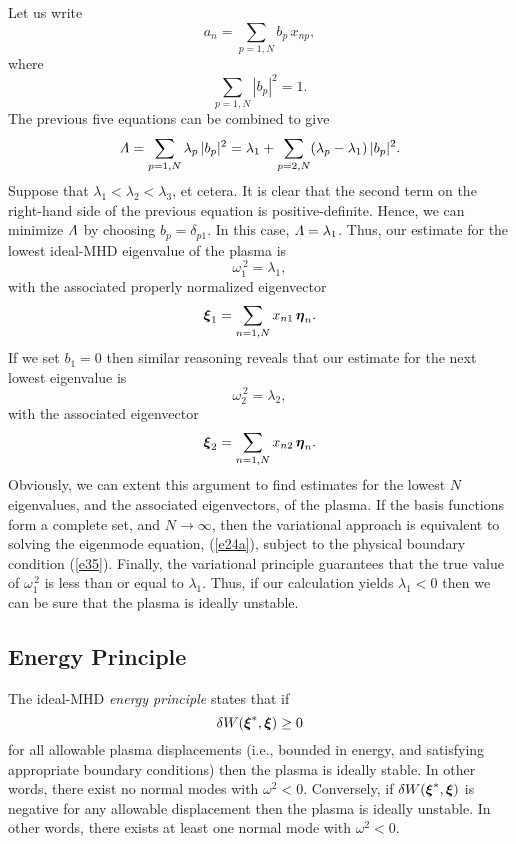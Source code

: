 \documentclass[12pt,prb,aps,notitlepage]{revtex4-1}
\newcommand{\bxi}{\mbox{\boldmath$\xi$}}
\newcommand{\bta}{\mbox{\boldmath$\eta$}}
\begin{document}
Let us write
\begin{equation}
a_n =\sum_{p=1,N}b_p\,x_{np},
\end{equation}
where
\begin{equation}
\sum_{p=1,N}|b_p|^2 = 1.
\end{equation}
The previous five equations can be combined to give
\begin{equation}
{\mit\Lambda} = \sum_{p=1,N}\lambda_p\,|b_p|^2= \lambda_1 +\sum_{p=2,N}(\lambda_p-\lambda_1)\,|b_p|^2.
\end{equation}
Suppose that $\lambda_1<\lambda_2<\lambda_3$, et cetera. It is clear that the second term on the right-hand side of the
previous equation is positive-definite. Hence, we can minimize ${\mit\Lambda}$ by choosing $b_p = \delta_{p1}$. In this case,
${\mit\Lambda}=\lambda_1$. Thus, our estimate for the lowest ideal-MHD eigenvalue of the plasma is
\begin{equation}
\omega_1^{\,2}= \lambda_1,
\end{equation}
with the associated properly normalized eigenvector
\begin{equation}
\bxi_1 = \sum_{n=1,N} x_{n1}\,\bta_{n}.
\end{equation}
If we set $b_1=0$ then similar reasoning reveals that our estimate for the next lowest eigenvalue is
\begin{equation}
\omega_2^{\,2}=\lambda_2,
\end{equation}
with the associated eigenvector
\begin{equation}
\bxi_2 = \sum_{n=1,N} x_{n2}\,\bta_{n}.
\end{equation}
Obviously, we can extent this argument to find estimates for the lowest $N$ eigenvalues, and the associated eigenvectors, of the plasma. If
the basis functions form a complete set, and $N\rightarrow\infty$,  then the variational approach is equivalent to solving the eigenmode equation, (\ref{e24a}), subject to
the physical boundary condition (\ref{e35}). 
Finally, the variational principle guarantees that the true value of $\omega_1^{\,2}$ is less than or equal to $\lambda_1$. Thus, 
if our calculation yields $\lambda_1<0$ then we can be sure that the plasma is ideally unstable. 

\subsection{Energy Principle}
The ideal-MHD {\em energy principle}\/ states that if
\begin{equation}
\delta W(\bxi^\ast,\bxi) \geq 0
\end{equation}
for all allowable plasma displacements (i.e., bounded in energy, and satisfying appropriate boundary conditions) then
the plasma is ideally stable. In other words, there exist no normal modes with $\omega^2<0$. Conversely, if $\delta W(\bxi^\ast,\bxi)$ is negative
for any allowable displacement then the plasma is ideally unstable. In other words, there exists at least one normal mode with $\omega^2<0$. 
\end{document}
